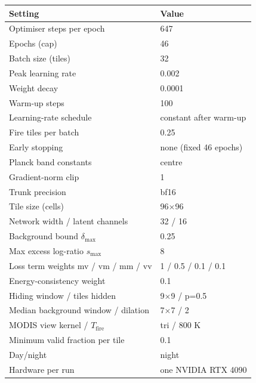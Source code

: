 \begin{tabular}{ll}
\toprule
Setting & Value \\
\midrule
Optimiser steps per epoch & 647 \\
Epochs (cap) & 46 \\
Batch size (tiles) & 32 \\
Peak learning rate & 0.002 \\
Weight decay & 0.0001 \\
Warm-up steps & 100 \\
Learning-rate schedule & constant after warm-up \\
Fire tiles per batch & 0.25 \\
Early stopping & none (fixed 46 epochs) \\
Planck band constants & centre \\
Gradient-norm clip & 1 \\
Trunk precision & bf16 \\
Tile size (cells) & 96$\times$96 \\
Network width / latent channels & 32 / 16 \\
Background bound $\delta_{\max}$ & 0.25 \\
Max excess log-ratio $s_{\max}$ & 8 \\
Loss term weights mv / vm / mm / vv & 1 / 0.5 / 0.1 / 0.1 \\
Energy-consistency weight & 0.1 \\
Hiding window / tiles hidden & 9$\times$9 / p=0.5 \\
Median background window / dilation & 7$\times$7 / 2 \\
MODIS view kernel / $T_{\mathrm{fire}}$ & tri / 800 K \\
Minimum valid fraction per tile & 0.1 \\
Day/night & night \\
Hardware per run & one NVIDIA RTX 4090 \\
\bottomrule
\end{tabular}
